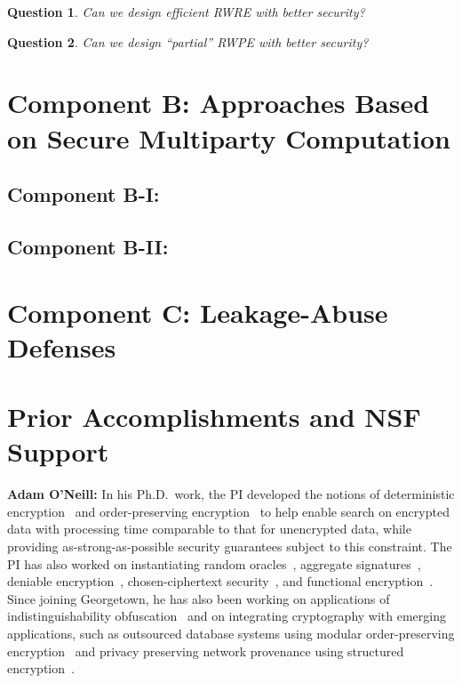 \documentclass[11pt]{article}
\newtheorem{question}{Question}[section]
\theoremstyle{remark}
\begin{document}
\begin{question}
Can we design efficient RWRE with better security?
\end{question}

\begin{question}
Can we design ``partial'' RWPE with better security?
\end{question}


 \section{Component B: Approaches Based on Secure Multiparty Computation}

\subsection{Component B-I:  }

\subsection{Component B-II:  }


\section{Component C: Leakage-Abuse Defenses}


\section{Prior Accomplishments and NSF Support}

\textbf{Adam O'Neill:}
In his Ph.D.~work, the PI  developed the notions of deterministic encryption~\cite{C:BelBolOne07,ABO07,C:BolFehOne08,C:BFOR08,TCC:FulNeiRey12} and order-preserving encryption~\cite{EC:BCLO09,C:BolCheOne11} to help enable search on encrypted data with processing time comparable to that for unencrypted data, while providing as-strong-as-possible security guarantees subject to this constraint.
The PI has also worked on  instantiating random oracles~\cite{C:KilOneSmi10,TCC:GoyONeRao11,EC:LewONeSmi13},   aggregate signatures~\cite{CCS:BGOY07,AC:GLOW12}, deniable encryption~\cite{C:OnePeiWat11},  chosen-ciphertext security~\cite{EC:KilMohOne10,PKC:DFMO14}, and  functional encryption~\cite{EPRINT:ONeill10b,C:DIJOPP13, CANS:BelONe13}.   %
Since joining Georgetown, he has also been working on  applications of indistinguishability obfuscation~\cite{DGLOZ14} and on integrating cryptography with emerging applications, such as outsourced database systems using modular order-preserving encryption~\cite{SIGMOD:MCOKC15} and  privacy preserving network provenance using structured encryption~\cite{LOSZZ14}.
\end{document}
